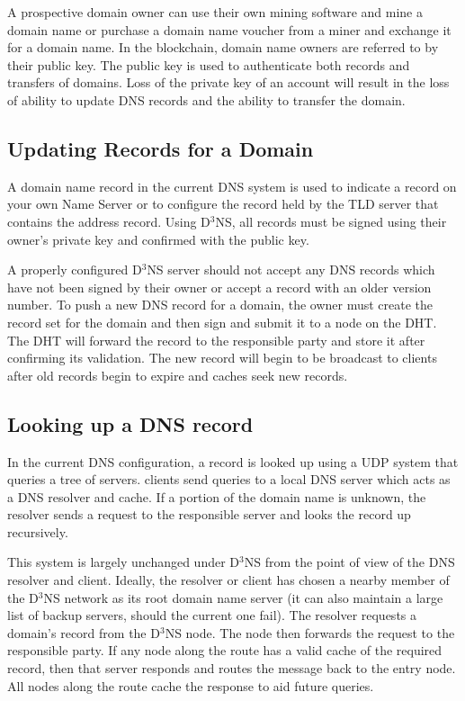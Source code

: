 \documentclass[11pt]{IEEEtran} %
\begin{document}
A prospective domain owner can use their own mining software and mine a domain name or purchase a domain name voucher from a miner and exchange it for a domain name. In the blockchain, domain name owners are referred to by their public key. The public key is used to authenticate both records and transfers of domains. Loss of the private key of an account will result in the loss of ability to update DNS records and the ability to transfer the domain. 


\subsection{Updating Records for a Domain}
A domain name record in the current DNS system is used to indicate a record on your own Name Server or to configure the record held by the TLD server that contains the address record. Using D$^3$NS, all records must be signed using their owner's private key and confirmed with the public key. 

A properly configured D$^3$NS server should not accept any DNS records which have not been signed by their owner or accept a record with an older version number. To push a new DNS record for a domain, the owner must create the record set for the domain and then sign and submit it to a node on the DHT. The DHT will forward the record to the responsible party and store it after confirming its validation. The new record will begin to be broadcast to clients after old records begin to expire and caches seek new records.

\subsection{Looking up a DNS record}
In the current DNS configuration, a record is looked up using a UDP system that queries a tree of servers. clients send queries to  a local DNS server which acts as a DNS resolver and cache. If a portion of the domain name is unknown, the resolver sends a request to the responsible server and looks the record up recursively.

This system is largely unchanged under D$^{3}$NS from the point of view of the DNS resolver and client. Ideally, the resolver or client has chosen a nearby member of the D$^{3}$NS network as its root domain name server (it can also maintain a large list of backup servers, should the current one fail). The resolver requests a domain's record from the D$^{3}$NS node. The node then forwards the request to the responsible party. If any node along the route has a valid cache of the required record, then that server responds and routes the message back to the entry node. All nodes along the route cache the response to aid future queries.
\end{document}
